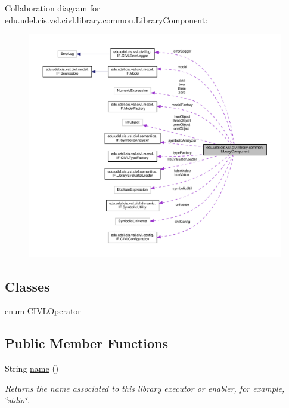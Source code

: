 Collaboration diagram for edu.\+udel.\+cis.\+vsl.\+civl.\+library.\+common.\+Library\+Component\+:
\nopagebreak
\begin{figure}[H]
\begin{center}
\leavevmode
\includegraphics[width=350pt]{classedu_1_1udel_1_1cis_1_1vsl_1_1civl_1_1library_1_1common_1_1LibraryComponent__coll__graph}
\end{center}
\end{figure}
\subsection*{Classes}
\begin{DoxyCompactItemize}
\item 
enum \hyperlink{enumedu_1_1udel_1_1cis_1_1vsl_1_1civl_1_1library_1_1common_1_1LibraryComponent_1_1CIVLOperator}{C\+I\+V\+L\+Operator}
\end{DoxyCompactItemize}
\subsection*{Public Member Functions}
\begin{DoxyCompactItemize}
\item 
String \hyperlink{classedu_1_1udel_1_1cis_1_1vsl_1_1civl_1_1library_1_1common_1_1LibraryComponent_af73cb2ab3ef623a9f247edf2656c1cab}{name} ()
\begin{DoxyCompactList}\small\item\em Returns the name associated to this library executor or enabler, for example, \char`\"{}stdio\char`\"{}. \end{DoxyCompactList}\end{DoxyCompactItemize}

